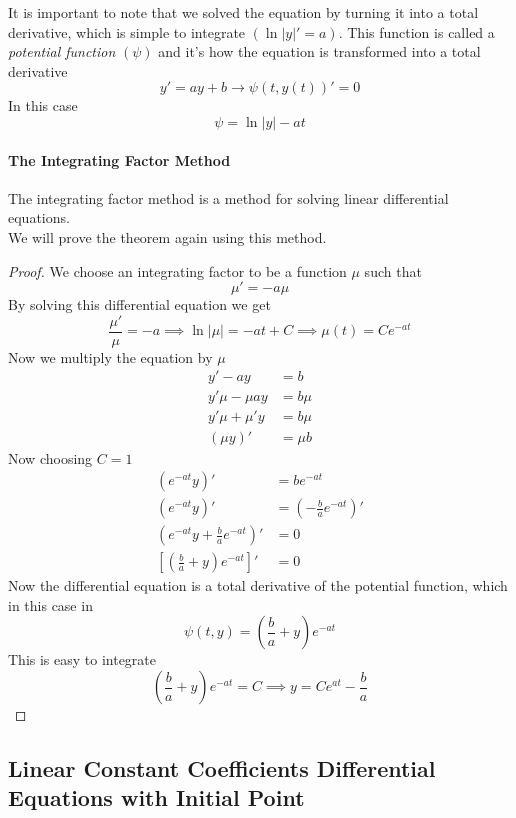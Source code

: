 \documentclass{article}
\begin{document}
\pagebreak

It is important to note that we solved the equation by turning
it into a total derivative, which is simple to integrate \((\ln|y|'=a)\).
This function is called a \textit{potential function} \((\psi)\) and it's how
the equation is transformed into a total derivative
\[
    y'=ay+b \rightarrow \psi(t, y(t))'=0
\]
In this case
\[
    \psi = \ln|y| - at
\]

\paragraph{The Integrating Factor Method}
The integrating factor method is a method for solving linear
differential equations.
\\
We will prove the theorem again using this method.
\begin{proof}
    We choose an integrating factor to be a function \(\mu\) such that
    \[
        \mu'=-a\mu
    \]
    By solving this differential equation we get
    \[
        \frac{\mu'}{\mu} = -a
        \implies
        \ln|\mu| = -at+C
        \implies
        \mu(t) = Ce^{-at}
    \]
    Now we multiply the equation by \(\mu\)
    \begin{align*}
        y'-ay&=b \\
        y'\mu - \mu ay &= b\mu \\
        y'\mu + \mu' y &= b \mu \\
        (\mu y)' &= \mu b
    \end{align*}
    Now choosing \(C=1\)
    \begin{align*}
        \left(e^{-at}y\right)'&=be^{-at} \\
        \left(e^{-at}y\right)'&=\left(-\frac{b}{a}e^{-at}\right)' \\
        \left(e^{-at}y+\frac{b}{a}e^{-at}\right)' &= 0 \\
        \left[\left(\frac{b}{a} + y\right)e^{-at}\right]' &= 0
    \end{align*}
    Now the differential equation is a total derivative of the potential function,
    which in this case in
    \[
        \psi(t, y) = \left(\frac{b}{a} + y\right)e^{-at}
    \]
    This is easy to integrate
    \[
        \left(\frac{b}{a} + y\right)e^{-at} = C
        \implies
        y = Ce^{at} - \frac{b}{a}
    \]
\end{proof}

\pagebreak

\subsection{Linear Constant Coefficients Differential Equations with Initial Point}
\end{document}
